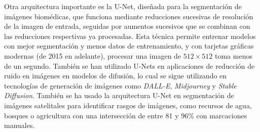 Otra arquitectura importante es la U-Net, diseñada para la segmentación de imágenes biomédicas, que funciona mediante
reducciones sucesivas de resolución de la imagen de entrada, seguidas por aumentos sucesivos que se combinan con las
reducciones respectivas ya procesadas. Esta técnica permite entrenar modelos con mejor segmentación y menos datos de
entrenamiento, y con tarjetas gráficas modernas (de 2015 en adelante), procesar una imagen de $512 \times 512$ toma
menos de un segundo. \autocite{ronneberger2015unetconvolutionalnetworksbiomedical} También se han utilizado U-Nets en
aplicaciones de reducción de ruido en imágenes en modelos de difusión, lo cual se sigue utilizando en tecnologías de
generación de imágenes como {\it DALL-E}, {\it Midjourney} y {\it Stable Diffusion}. \autocite{ho2020denoising} También
se ha usado la arquitectura U-Net en segmentación de imágenes satelitales para identificar rasgos de imágenes, como
recursos de agua, bosques o agricultura con una intersección de entre 81 y 96\% con marcaciones manuales.
\autocite{khryashchev2018}

